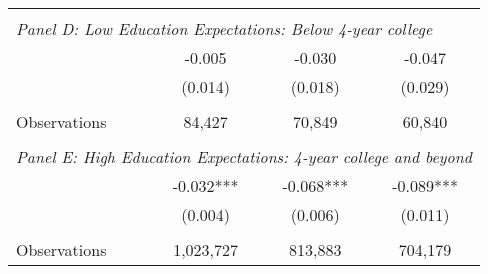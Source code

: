 {\begin{tabular}{lccc}
&  &  &   \\
\multicolumn{4}{l}{\textit{Panel D: Low Education Expectations: Below 4-year college}} \\
\hspace{3mm}        &      -0.005   &      -0.030   &      -0.047   \\
                    &     (0.014)   &     (0.018)   &     (0.029)   \\
                    &               &               &               \\
\hspace{3mm}Observations&      84,427   &      70,849   &      60,840   \\
 
&  &  &   \\
\multicolumn{4}{l}{\textit{Panel E: High Education Expectations: 4-year college and beyond}} \\
\hspace{3mm}        &      -0.032***&      -0.068***&      -0.089***\\
                    &     (0.004)   &     (0.006)   &     (0.011)   \\
                    &               &               &               \\
\hspace{3mm}Observations&   1,023,727   &     813,883   &     704,179   \\
 

\bottomrule
\end{tabular}
}
